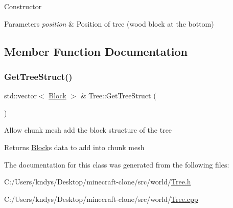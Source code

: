 Constructor 


\begin{DoxyParams}{Parameters}
{\em position} & Position of tree (wood block at the bottom)\\
\hline
\end{DoxyParams}


\subsection{Member Function Documentation}
\mbox{\label{class_tree_a09925b63b3d7fe8ba227fd454aa0906c}} 
\subsubsection{\texorpdfstring{Get\+Tree\+Struct()}{GetTreeStruct()}}
{\footnotesize\ttfamily std\+::vector$<$ \mbox{\hyperlink{class_block}{Block}} $>$ \& Tree\+::\+Get\+Tree\+Struct (\begin{DoxyParamCaption}{ }\end{DoxyParamCaption})}



Allow chunk mesh add the block structure of the tree 

\begin{DoxyReturn}{Returns}
\mbox{\hyperlink{class_block}{Block}}\textquotesingle{}s data to add into chunk mesh
\end{DoxyReturn}


The documentation for this class was generated from the following files\+:\begin{DoxyCompactItemize}
\item 
C\+:/\+Users/kndys/\+Desktop/minecraft-\/clone/src/world/\mbox{\hyperlink{_tree_8h}{Tree.\+h}}\item 
C\+:/\+Users/kndys/\+Desktop/minecraft-\/clone/src/world/\mbox{\hyperlink{_tree_8cpp}{Tree.\+cpp}}\end{DoxyCompactItemize}
